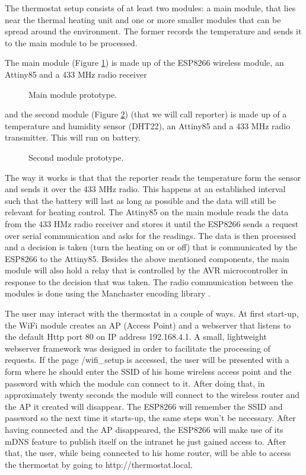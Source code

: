\documentclass[conference]{IEEEtran}
\begin{document}
The thermostat setup consists of at least two modules: a main module, that lies near the thermal heating unit
and one or more smaller modules that can be spread around the environment. The former records the temperature
and sends it to the main module to be processed.

The main module (Figure \ref{fig:first_module}) is made up of the ESP8266 wireless module, an Attiny85 and a
433 MHz radio receiver

\begin{figure}[h!]
\label{fig:first_module}
\centerline{}
      \caption[MainModule]{Main module prototype.}
\label{fig:first_module}
\end{figure}

and the second module (Figure \ref{fig:second_module}) (that we will call reporter) is made up of a temperature and humidity sensor (DHT22), an
Attiny85 and a 433 MHz radio transmitter. This will run on battery.

\begin{figure}[h!]
\label{fig:nn}
\centerline{}
      \caption[MainModule]{Second module prototype.}
\label{fig:second_module}
\end{figure}

The way it works is that that the reporter reads the temperature form the sensor and sends it over the 433 MHz
radio. This happens at an established interval such that the battery will last as long as possible
and the data will still be relevant for heating control. The Attiny85 on the main module reads the data
from the 433 HMz radio receiver and stores it until the ESP8266 sends a request over serial communication and asks
for the readings. The data is then processed and a decision is taken (turn the heating on or off) that is
communicated by the ESP8266 to the Attiny85. Besides the above mentioned components, the main module will
also hold a relay that is controlled by the AVR microcontroller in response to the decision that was taken.
The radio communication between the modules is done using the Manchaster encoding library
\cite{website:manchester}.

The user may interact with the thermostat in a couple of ways.
At first start-up, the WiFi module creates an AP (Access Point) and a webserver that listens to the default Http port 80
on IP address 192.168.4.1. A small, lightweight webserver framework was designed in order to facilitate the
processing of requests.
If the page /wifi\_setup is accessed, the user will be presented with a form
where he should enter the SSID of his home wireless access point and the password with which the module
can connect to it. After doing that, in approximately twenty seconds the module will connect to the wireless
router and the AP it created will disappear. The ESP8266 will remember the SSID and password so the next time
it starts-up, the same steps won't be necessary.
After having connected and the AP disappeared, the ESP8266 will make use of its mDNS feature to publish itself
on the intranet he just gained access to. After that, the user, while being connected to his home router, will
be able to access the thermostat by going to http://thermostat.local.
\end{document}
